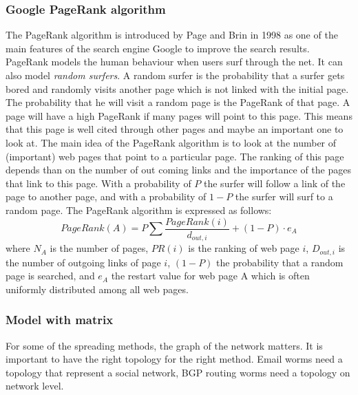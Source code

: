 \subsubsection{Google PageRank algorithm}
The PageRank algorithm is introduced by Page and Brin in 1998 as one of the main features of the search engine Google to improve the search results. PageRank models the human behaviour when users surf through the net. It can also model \textit{random surfers}. A random surfer is the probability that a surfer gets bored and randomly visits another page which is not linked with the initial page. The probability that he will visit a random page is the PageRank of that page. A page will have a high PageRank if many pages will point to this page. This means that this page is well cited through other pages and maybe an important one to look at.    The main idea of the PageRank algorithm is to look at the number of (important) web pages that point to a particular page. The ranking of this page depends than on the number of out coming links and the importance of the pages that link to this page. With a probability of $P$ the surfer will follow a link of the page to another page, and with a probability of $1-P$ the surfer will surf to a random page. The PageRank algorithm is expressed as follows:
\begin{equation}
PageRank(A)=P \sum \dfrac{PageRank(i)}{d_{out,i}} + (1-P) \cdot e_{A}
\end{equation}
where $N_{A}$ is the number of pages, $PR(i)$ is the ranking of web page $i$, $D_{out,i}$ is the number of outgoing links of page $i$, $(1-P)$ the probability that a random page is searched, and $e_{A}$ the restart value for web page A which is often uniformly distributed among all web pages.

\subsubsection{Model with matrix}


For some of the spreading methods, the graph of the network matters. It is important to have the right topology for the right method. Email worms need a topology that represent a social network, BGP routing worms need a topology on network level. \\
%

